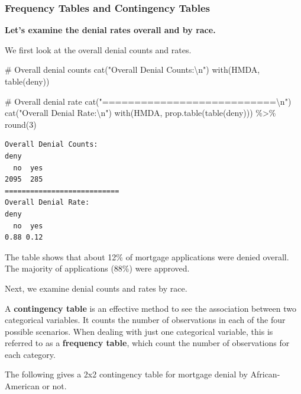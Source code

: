 \documentclass[
  12pt,
  letterpaper,
]{scrbook}
\newenvironment{Shaded}{\begin{snugshade}}{\end{snugshade}}
\newcommand{\CommentTok}[1]{\textcolor[rgb]{0.37,0.37,0.37}{#1}}
\newcommand{\DecValTok}[1]{\textcolor[rgb]{0.68,0.00,0.00}{#1}}
\newcommand{\FunctionTok}[1]{\textcolor[rgb]{0.28,0.35,0.67}{#1}}
\newcommand{\NormalTok}[1]{\textcolor[rgb]{0.00,0.23,0.31}{#1}}
\newcommand{\SpecialCharTok}[1]{\textcolor[rgb]{0.37,0.37,0.37}{#1}}
\newcommand{\StringTok}[1]{\textcolor[rgb]{0.13,0.47,0.30}{#1}}
\theoremstyle{definition}
\theoremstyle{plain}
\theoremstyle{remark}
\begin{document}
\subsubsection{Frequency Tables and Contingency
Tables}\label{frequency-tables-and-contingency-tables}

\textbf{Let's examine the denial rates overall and by race.}

We first look at the overall denial counts and rates.

\begin{Shaded}
\begin{Highlighting}[]
\CommentTok{\# Overall denial counts}
\FunctionTok{cat}\NormalTok{(}\StringTok{"Overall Denial Counts:}\SpecialCharTok{\textbackslash{}n}\StringTok{"}\NormalTok{)}
\FunctionTok{with}\NormalTok{(HMDA, }\FunctionTok{table}\NormalTok{(deny))}

\CommentTok{\# Overall denial rate}
\FunctionTok{cat}\NormalTok{(}\StringTok{"===========================}\SpecialCharTok{\textbackslash{}n}\StringTok{"}\NormalTok{)}
\FunctionTok{cat}\NormalTok{(}\StringTok{"Overall Denial Rate:}\SpecialCharTok{\textbackslash{}n}\StringTok{"}\NormalTok{)}
\FunctionTok{with}\NormalTok{(HMDA, }\FunctionTok{prop.table}\NormalTok{(}\FunctionTok{table}\NormalTok{(deny))) }\SpecialCharTok{\%\textgreater{}\%} \FunctionTok{round}\NormalTok{(}\DecValTok{3}\NormalTok{)}
\end{Highlighting}
\end{Shaded}

\begin{verbatim}
Overall Denial Counts:
deny
  no  yes 
2095  285 
===========================
Overall Denial Rate:
deny
  no  yes 
0.88 0.12 
\end{verbatim}

The table shows that about 12\% of mortgage applications were denied
overall. The majority of applications (88\%) were approved.

Next, we examine denial counts and rates by race.

A {\textbf{contingency table}} is an effective method to see the
association between two categorical variables. It counts the number of
observations in each of the four possible scenarios. When dealing with
just one categorical variable, this is referred to as a
\textbf{frequency table}, which count the number of observations for
each category.

The following gives a 2x2 contingency table for mortgage denial by
African-American or not.
\end{document}
